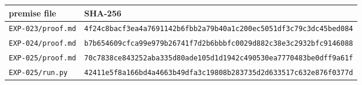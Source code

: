 \begin{tabular}{@{}ll@{}}
\toprule
premise file & SHA-256\\
\midrule
\texttt{EXP-023/proof.md} & \texttt{\scriptsize 4f24c8bacf3ea4a7691142b6fbb2a79b40a1c200ec5051df3c79c3dc45bed084}\\
\texttt{EXP-024/proof.md} & \texttt{\scriptsize b7b654609cfca99e979b26741f7d2b6bbbfc0029d882c38e3c2932bfc9146088}\\
\texttt{EXP-025/proof.md} & \texttt{\scriptsize 70c7838ce843252aba335d80ade105d1d1942c490530ea7770483be0dff9a61f}\\
\texttt{EXP-025/run.py} & \texttt{\scriptsize 42411e5f8a166bd4a4663b49dfa3c19808b283735d2d633517c632e876f0377d}\\
\bottomrule
\end{tabular}
